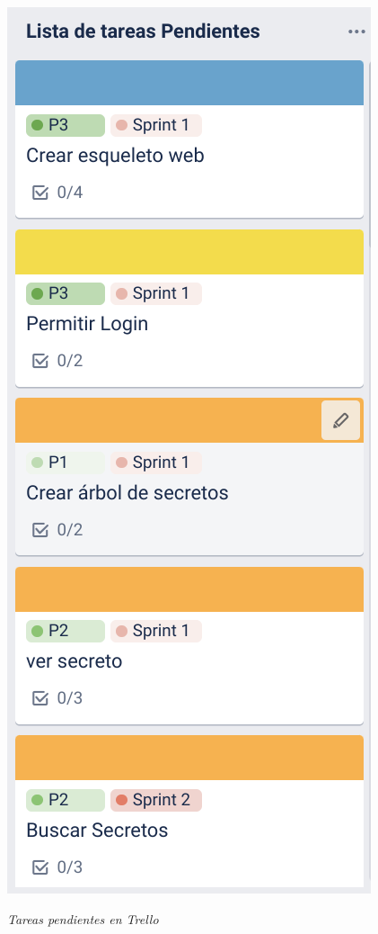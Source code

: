 \documentclass{\ClassPath/viu-tfm-template}
\begin{document}
\begin{minipage}{0.32\linewidth}
        \includegraphics[width=\linewidth]{img/tareas.png}
    \vspace{-30pt}
    \begin{center}
        {\scriptsize \textit{Tareas pendientes en Trello}}
    \end{center}
\end{minipage}
\end{document}

